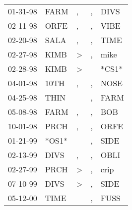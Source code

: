 \begin{supertabular}{p{0.07\textwidth}p{0.06\textwidth}p{0.02\textwidth}p{0.02\textwidth}p{0.06\textwidth}}
 01-31-98\textsuperscript{} &  FARM\textsuperscript{} &             , &  , &  DIVS\textsuperscript{} \\
 02-11-98\textsuperscript{} &  ORFE\textsuperscript{} &             , &  , &  VIBE\textsuperscript{} \\
 02-20-98\textsuperscript{} &  SALA\textsuperscript{} &             , &  , &  TIME\textsuperscript{} \\
 02-27-98\textsuperscript{} &  KIMB\textsuperscript{} &  \textgreater &  , &  mike\textsuperscript{} \\
 02-28-98\textsuperscript{} &  KIMB\textsuperscript{} &  \textgreater &    &                   *CS1* \\
 04-01-98\textsuperscript{} &  10TH\textsuperscript{} &             , &  , &  NOSE\textsuperscript{} \\
 04-25-98\textsuperscript{} &  THIN\textsuperscript{} &               &  , &  FARM\textsuperscript{} \\
 05-08-98\textsuperscript{} &  FARM\textsuperscript{} &             , &  , &   BOB\textsuperscript{} \\
 10-01-98\textsuperscript{} &  PRCH\textsuperscript{} &             , &  , &  ORFE\textsuperscript{} \\
 01-21-99\textsuperscript{} &                   *OS1* &               &  , &  SIDE\textsuperscript{} \\
 02-13-99\textsuperscript{} &  DIVS\textsuperscript{} &             , &  , &  OBLI\textsuperscript{} \\
 02-27-99\textsuperscript{} &  PRCH\textsuperscript{} &  \textgreater &  , &  crip\textsuperscript{} \\
 07-10-99\textsuperscript{} &  DIVS\textsuperscript{} &  \textgreater &  , &  SIDE\textsuperscript{} \\
 05-12-00\textsuperscript{} &  TIME\textsuperscript{} &               &  , &  FUSS\textsuperscript{} \\
\end{supertabular}
